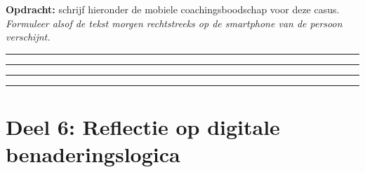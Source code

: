 \documentclass[11pt,a4paper]{article}
\newcommand{\writeline}{\vspace{0.22em}\noindent\rule{\linewidth}{0.25pt}\vspace{0.42em}\par}
\newcommand{\messagelines}{\writeline\writeline\writeline\writeline}
\begin{document}
\begin{responsebox}
\small\textbf{Opdracht:} schrijf hieronder de mobiele coachingsboodschap voor deze casus.
\textit{Formuleer alsof de tekst morgen rechtstreeks op de smartphone van de persoon verschijnt.}

\messagelines
\end{responsebox}

\vspace{0.6em}
\newpage



\section{Deel 6: Reflectie op digitale benaderingslogica}
\end{document}
